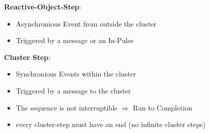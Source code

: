 \textbf{Reactive-Object-Step}:
\begin{itemize}
    \item Asynchronious Event from outside the cluster
    \item Triggered by a message or an In-Pulse
\end{itemize}

\textbf{Cluster Step}: 
\begin{itemize}
    \item Synchronious Events within the cluster
    \item Triggered by a message to the cluster
     \item The sequence is not interruptible $\Rightarrow$ Run to Completion
     \item every cluster-step must have an end (no infinite cluster steps)
\end{itemize}

\clearpage